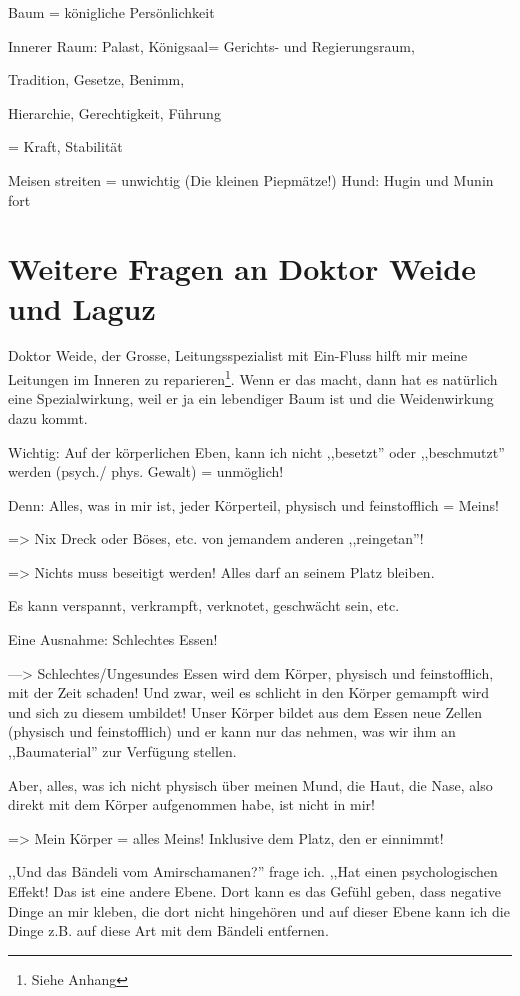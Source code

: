 \documentclass[11pt,titlepage,a5paper]{book}
\begin{document}
Baum = königliche Persönlichkeit

Innerer Raum: Palast, Königsaal= Gerichts- und Regierungsraum, 

Tradition, Gesetze, Benimm,

Hierarchie, Gerechtigkeit, Führung

= Kraft, Stabilität

Meisen streiten = unwichtig (Die kleinen Piepmätze!)
Hund: Hugin und Munin fort

\section{Weitere Fragen an Doktor Weide und Laguz  }

Doktor Weide, der Grosse, Leitungsspezialist mit Ein-Fluss hilft mir meine Leitungen im Inneren zu reparieren\footnote{Siehe Anhang}. Wenn er das macht, dann hat es natürlich eine Spezialwirkung, weil er ja ein lebendiger Baum ist und die Weidenwirkung dazu kommt.

Wichtig: Auf der körperlichen Eben, kann ich nicht ,,besetzt'' oder ,,beschmutzt'' werden (psych./ phys. Gewalt) = unmöglich!

Denn: Alles, was in mir ist, jeder Körperteil, physisch und feinstofflich = Meins!

=> Nix Dreck oder Böses, etc. von jemandem anderen ,,reingetan''!

=> Nichts muss beseitigt werden! Alles darf an seinem Platz bleiben.

Es kann verspannt, verkrampft, verknotet, geschwächt sein, etc.

Eine Ausnahme: Schlechtes Essen!

---> Schlechtes/Ungesundes Essen wird dem Körper, physisch und feinstofflich, mit der Zeit schaden! Und zwar, weil es schlicht in den Körper gemampft wird und sich zu diesem umbildet! Unser Körper bildet aus dem Essen neue Zellen (physisch und feinstofflich) und er kann nur das nehmen, was wir ihm an ,,Baumaterial'' zur Verfügung stellen.

Aber, alles, was ich nicht physisch über meinen Mund, die Haut, die Nase, also direkt mit dem Körper aufgenommen habe, ist nicht in mir!

=> Mein Körper = alles Meins! Inklusive dem Platz, den er einnimmt!

,,Und das Bändeli vom Amirschamanen?'' frage ich. ,,Hat einen psychologischen Effekt! Das ist eine andere Ebene. Dort kann es das Gefühl geben, dass negative Dinge an mir kleben, die dort nicht hingehören und auf dieser Ebene kann ich die Dinge z.B. auf diese Art mit dem Bändeli entfernen.
\end{document}
